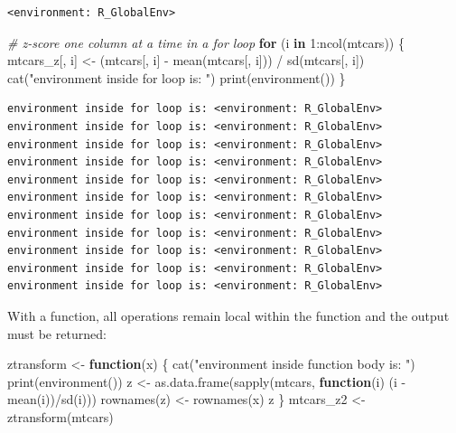 \documentclass[
]{book}
\newenvironment{Shaded}{\begin{snugshade}}{\end{snugshade}}
\newcommand{\CommentTok}[1]{\textcolor[rgb]{0.56,0.35,0.01}{\textit{#1}}}
\newcommand{\ControlFlowTok}[1]{\textcolor[rgb]{0.13,0.29,0.53}{\textbf{#1}}}
\newcommand{\DecValTok}[1]{\textcolor[rgb]{0.00,0.00,0.81}{#1}}
\newcommand{\FunctionTok}[1]{\textcolor[rgb]{0.00,0.00,0.00}{#1}}
\newcommand{\NormalTok}[1]{#1}
\newcommand{\OtherTok}[1]{\textcolor[rgb]{0.56,0.35,0.01}{#1}}
\newcommand{\SpecialCharTok}[1]{\textcolor[rgb]{0.00,0.00,0.00}{#1}}
\newcommand{\StringTok}[1]{\textcolor[rgb]{0.31,0.60,0.02}{#1}}
\begin{document}
\begin{verbatim}
<environment: R_GlobalEnv>
\end{verbatim}

\begin{Shaded}
\begin{Highlighting}[]
\CommentTok{\# z{-}score one column at a time in a for loop}
\ControlFlowTok{for}\NormalTok{ (i }\ControlFlowTok{in} \DecValTok{1}\SpecialCharTok{:}\FunctionTok{ncol}\NormalTok{(mtcars)) \{}
\NormalTok{  mtcars\_z[, i] }\OtherTok{\textless{}{-}}\NormalTok{ (mtcars[, i] }\SpecialCharTok{{-}} \FunctionTok{mean}\NormalTok{(mtcars[, i])) }\SpecialCharTok{/} \FunctionTok{sd}\NormalTok{(mtcars[, i])}
  \FunctionTok{cat}\NormalTok{(}\StringTok{"environment inside for loop is: "}\NormalTok{)}
  \FunctionTok{print}\NormalTok{(}\FunctionTok{environment}\NormalTok{())}
\NormalTok{\}}
\end{Highlighting}
\end{Shaded}

\begin{verbatim}
environment inside for loop is: <environment: R_GlobalEnv>
environment inside for loop is: <environment: R_GlobalEnv>
environment inside for loop is: <environment: R_GlobalEnv>
environment inside for loop is: <environment: R_GlobalEnv>
environment inside for loop is: <environment: R_GlobalEnv>
environment inside for loop is: <environment: R_GlobalEnv>
environment inside for loop is: <environment: R_GlobalEnv>
environment inside for loop is: <environment: R_GlobalEnv>
environment inside for loop is: <environment: R_GlobalEnv>
environment inside for loop is: <environment: R_GlobalEnv>
environment inside for loop is: <environment: R_GlobalEnv>
\end{verbatim}

With a function, all operations remain local within the function and the output must be returned:

\begin{Shaded}
\begin{Highlighting}[]
\NormalTok{ztransform }\OtherTok{\textless{}{-}} \ControlFlowTok{function}\NormalTok{(x) \{}
  \FunctionTok{cat}\NormalTok{(}\StringTok{"environment inside function body is: "}\NormalTok{)}
  \FunctionTok{print}\NormalTok{(}\FunctionTok{environment}\NormalTok{())}
\NormalTok{  z }\OtherTok{\textless{}{-}} \FunctionTok{as.data.frame}\NormalTok{(}\FunctionTok{sapply}\NormalTok{(mtcars, }\ControlFlowTok{function}\NormalTok{(i) (i }\SpecialCharTok{{-}} \FunctionTok{mean}\NormalTok{(i))}\SpecialCharTok{/}\FunctionTok{sd}\NormalTok{(i)))}
  \FunctionTok{rownames}\NormalTok{(z) }\OtherTok{\textless{}{-}} \FunctionTok{rownames}\NormalTok{(x)}
\NormalTok{  z}
\NormalTok{\}}
\NormalTok{mtcars\_z2 }\OtherTok{\textless{}{-}} \FunctionTok{ztransform}\NormalTok{(mtcars)}
\end{Highlighting}
\end{Shaded}
\end{document}
